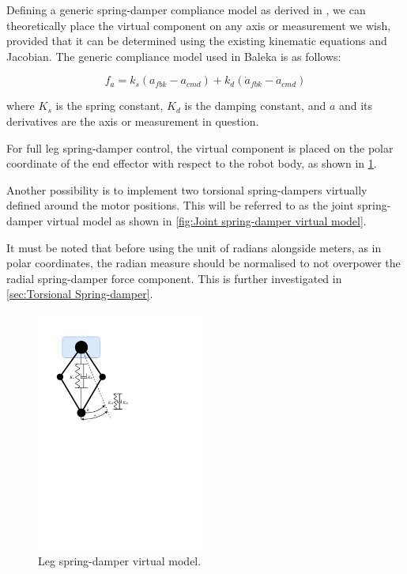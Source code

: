 Defining a generic spring-damper compliance model as derived in \cite{Kalouche2016}, we can theoretically place the virtual component on any axis or measurement we wish, provided that it can be determined using the existing kinematic equations and Jacobian. The generic compliance model used in Baleka is as follows:

\begin{equation}
f_a = k_s(a_{fbk} - a_{cmd}) + k_d(\dot{a}_{fbk} - \dot{a}_{cmd})
\end{equation}

where $K_s$ is the spring constant, $K_d$ is the damping constant, and $a$ and its derivatives are the axis or measurement in question.

For full leg spring-damper control, the virtual component is placed on the polar coordinate of the end effector with respect to the robot body, as shown in \cref{fig:Leg spring-damper virtual model}. 

Another possibility is to implement two torsional spring-dampers virtually defined around the motor positions. This will be referred to as the joint spring-damper virtual model as shown in \cref{fig:Joint spring-damper virtual model}.

It must be noted that before using the unit of radians alongside meters, as in polar coordinates, the radian measure should be normalised to not overpower the radial spring-damper force component. This is further investigated in \cref{sec:Torsional Spring-damper}.

\begin{figure}
\centering
\includegraphics[clip, trim=2cm 15cm 9cm 2cm, page = 1, width=0.5\textwidth]{images/geometry/leg-spring-damper} 
\caption{Leg spring-damper virtual model.}
\label{fig:Leg spring-damper virtual model}
\end{figure}

